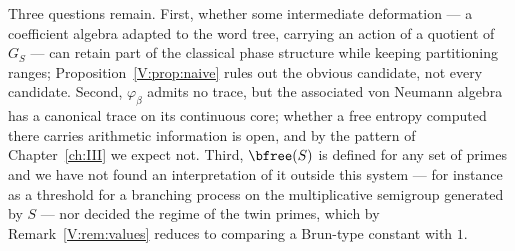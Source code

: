 Three questions remain. First, whether some intermediate deformation --- a coefficient
algebra adapted to the word tree, carrying an action of a quotient of $G_S$ --- can retain
part of the classical phase structure while keeping partitioning ranges; Proposition~\ref{V:prop:naive}
rules out the obvious candidate, not every candidate. Second, $\varphi_\beta$ admits no
trace, but the associated von Neumann algebra has a canonical trace on its continuous core;
whether a free entropy computed there carries arithmetic information is open, and by the
pattern of Chapter~\ref{ch:III} we expect not. Third, $\bfree(S)$ is defined
for any set of primes and we have not found an interpretation of it outside this system ---
for instance as a threshold for a branching process on the multiplicative semigroup generated
by $S$ --- nor decided the regime of the twin primes, which by Remark~\ref{V:rem:values}
reduces to comparing a Brun-type constant with $1$.

